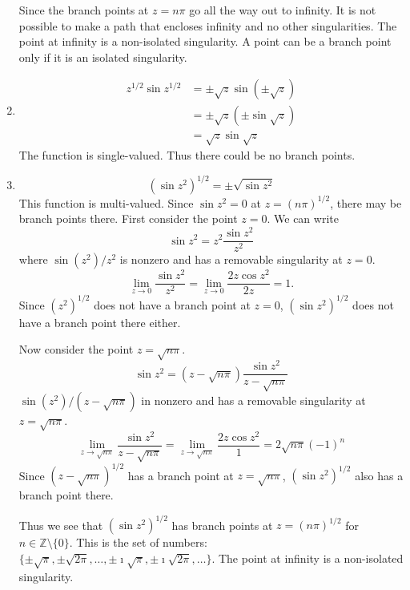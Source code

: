 \begin{Example}
\begin{enumerate}
    Since the branch points at $z = n \pi$ go all the way out to infinity.
    It is not possible to make a path that encloses infinity and no other
    singularities.  The point at infinity is a non-isolated singularity.
    A point can be a branch point only if it is an isolated singularity.
  \item 
    \begin{align*}
      z^{1/2} \sin z^{1/2}
      &= \pm \sqrt{z} \sin \left( \pm \sqrt{z} \right) 
      \\
      &= \pm \sqrt{z} \left( \pm \sin \sqrt{z} \right) 
      \\
      &= \sqrt{z} \sin \sqrt{z} 
    \end{align*}
    The function is single-valued.  
    Thus there could be no branch points.
  \item
    \[
    \left( \sin z^2 \right)^{1/2} = \pm \sqrt{ \sin z^2 }
    \]
    This function is multi-valued.  Since $\sin z^2 = 0$ at $z = (n \pi)^{1/2}$,
    there may be branch points there.  First consider the point $z = 0$.
    We can write
    \[
    \sin z^2 = z^2 \frac{\sin z^2}{z^2}
    \]
    where  $\sin\left( z^2 \right) / z^2$ is nonzero and has a removable singularity 
    at $z = 0$.
    \[
    \lim_{z \to 0} \frac{\sin z^2}{z^2} = \lim_{z \to 0} \frac{2 z \cos z^2}{2 z} = 1.
    \]
    Since $\left( z^2 \right)^{1/2}$ does not have a branch point at $z = 0$, 
    $\left( \sin z^2 \right)^{1/2}$
    does not have a branch point there either.

    Now consider the point $z = \sqrt{n \pi}$.
    \[
    \sin z^2 = \left( z - \sqrt{n \pi} \right)  \frac{\sin z^2}{z - \sqrt{n \pi}}
    \]
    $\sin\left( z^2 \right) / \left( z - \sqrt{n \pi} \right)$ in nonzero 
    and has a removable singularity at $z = \sqrt{n \pi}$.
    \[
    \lim_{z \to \sqrt{n \pi}} \frac{\sin z^2}{z - \sqrt{n \pi}}
    = \lim_{z \to \sqrt{n \pi}} \frac{2 z \cos z^2}{1}
    = 2 \sqrt{n \pi} (-1)^n
    \]
    Since $\left( z - \sqrt{n \pi} \right)^{1/2}$ has a branch point at $z = \sqrt{n \pi}$,
    $\left( \sin z^2 \right)^{1/2}$ also has a branch point there.

    Thus we see that $\left( \sin z^2 \right)^{1/2}$ has branch points at 
    $z = (n \pi)^{1/2}$ for $n \in \mathbb{Z} \setminus \{0\}$.
    This is the set of numbers: $\{ \pm \sqrt{\pi}, \pm \sqrt{2 \pi}, \ldots,
    \pm \imath \sqrt{\pi}, \pm \imath \sqrt{2 \pi}, \ldots \}$.
    The point at infinity is a non-isolated singularity.
  \end{enumerate}
\end{Example}









